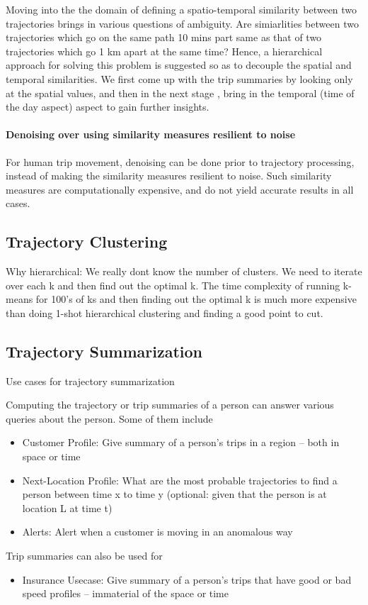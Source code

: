 \par Moving into the the domain of defining a spatio-temporal similarity between two trajectories brings in various questions of ambiguity. Are simiarlities between two trajectories which go on the same path 10 mins part same as that of two trajectories which go 1 km apart at the same time? Hence, a hierarchical approach for solving this problem is suggested so as to decouple the spatial and temporal similarities. We first come up with the trip summaries by looking only at the spatial values, and then in the next stage , bring in the temporal (time of the day aspect) aspect to gain further insights.

\paragraph{Denoising over using similarity measures resilient to noise}
\par For human trip movement, denoising can be done prior to trajectory processing, instead of making the similarity measures resilient to noise. Such similarity measures are computationally expensive, and do not yield accurate results in all cases.

\subsection{Trajectory Clustering}

Why hierarchical: We really dont know the number of clusters. We need to iterate over each k and then find out the optimal k. The time complexity of running k-means for 100's of ks and then finding out the optimal k is much more expensive than doing 1-shot hierarchical clustering and finding a good point to cut. %

\subsection{Trajectory Summarization}

\par { Use cases for trajectory summarization}

Computing the trajectory or trip summaries of a person can answer various queries about the person. Some of them include 
	  \begin{itemize}
			\item Customer Profile: Give summary of a person's trips in a region -- both in space or time
			\item Next-Location Profile: What are the most probable trajectories to find a person between time x to time y (optional: given that the person is at location L at time t)
			\item Alerts: Alert when a customer is moving in an anomalous way
		\end{itemize}
Trip summaries can also be used for
		\begin{itemize}
			\item Insurance Usecase: Give summary of a person's trips that have good or bad speed profiles -- immaterial of the space or time
		\end{itemize}


